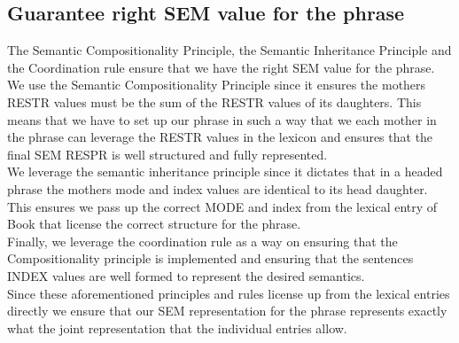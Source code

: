 \documentclass{article}
\begin{document}
\subsection{Guarantee right SEM value for the phrase}
The Semantic Compositionality Principle, the Semantic Inheritance Principle and the Coordination rule ensure that we have the right SEM value for the phrase. \\ We use the Semantic Compositionality Principle since it ensures the mothers RESTR values must be the sum of the RESTR values of its daughters. This means that we have to set up our phrase in such a way that we each mother in the phrase can leverage the RESTR values in the lexicon and ensures that the final SEM RESPR is well structured and fully represented. \\
We leverage the semantic inheritance principle since it dictates that in a headed phrase the mothers mode and index values are identical to its head daughter. This ensures we pass up the correct MODE and index from the lexical entry of Book that license the correct structure for the phrase. \\
Finally, we leverage the coordination rule as a way on ensuring that the Compositionality principle is implemented and ensuring that the sentences INDEX values are well formed to represent the desired semantics. \\
Since these aforementioned principles and rules license up from the lexical entries directly we ensure that our SEM representation for the phrase represents exactly what the joint representation that the individual entries allow. 
\end{document}
